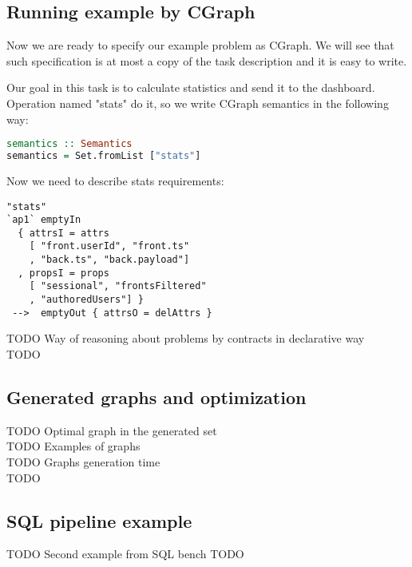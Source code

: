 \label{sec:eval}
\subsection{Running example by CGraph}

Now we are ready to specify our example problem as CGraph.
We will see that such specification is at most a copy of the task description and it is easy to write.

Our goal in this task is to calculate statistics and send it to the dashboard.
Operation named "stats" do it, so we write CGraph semantics in the following way:
\begin{lstlisting}[language=Haskell]
semantics :: Semantics
semantics = Set.fromList ["stats"]
\end{lstlisting}

Now we need to describe stats requirements:
\begin{lstlisting}
"stats"
`ap1` emptyIn
  { attrsI = attrs
    [ "front.userId", "front.ts"
    , "back.ts", "back.payload"]
  , propsI = props
    [ "sessional", "frontsFiltered"
    , "authoredUsers"] }
 -->  emptyOut { attrsO = delAttrs }
\end{lstlisting}


TODO Way of reasoning about problems by contracts in declarative way \\
TODO

\subsection{Generated graphs and optimization}

TODO Optimal graph in the generated set \\
TODO Examples of graphs \\
TODO Graphs generation time \\
TODO

\subsection{SQL pipeline example}

TODO Second example from SQL bench
TODO
